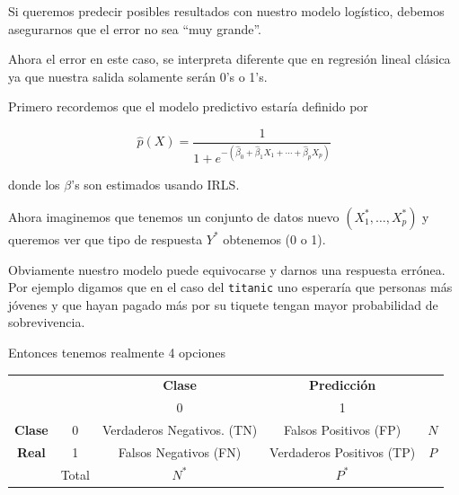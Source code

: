 \documentclass[
  12pt,
]{book}
\newenvironment{Shaded}{\begin{snugshade}}{\end{snugshade}}
\newcommand{\DataTypeTok}[1]{\textcolor[rgb]{0.13,0.29,0.53}{#1}}
\newcommand{\DecValTok}[1]{\textcolor[rgb]{0.00,0.00,0.81}{#1}}
\newcommand{\FloatTok}[1]{\textcolor[rgb]{0.00,0.00,0.81}{#1}}
\newcommand{\KeywordTok}[1]{\textcolor[rgb]{0.13,0.29,0.53}{\textbf{#1}}}
\newcommand{\NormalTok}[1]{#1}
\newcommand{\OperatorTok}[1]{\textcolor[rgb]{0.81,0.36,0.00}{\textbf{#1}}}
\newcommand{\StringTok}[1]{\textcolor[rgb]{0.31,0.60,0.02}{#1}}
\theoremstyle{definition}
\theoremstyle{definition}
\theoremstyle{definition}
\theoremstyle{remark}
\begin{document}
Si queremos predecir posibles resultados con nuestro modelo logístico, debemos asegurarnos que el error no sea \enquote{muy grande}.

Ahora el error en este caso, se interpreta diferente que en regresión lineal clásica ya que nuestra salida solamente serán 0's o 1's.

Primero recordemos que el modelo predictivo estaría definido por

\begin{equation*}
\hat{p}(X)=\frac{1}{1+e^{-(\hat{\beta}_{0}+\hat{\beta}_{1} X_{1}+\cdots+\hat{\beta}_{p} X_{p})}}
\end{equation*}

donde los \(\beta\)'s son estimados usando IRLS.

Ahora imaginemos que tenemos un conjunto de datos nuevo \((X^{*}_{1},\ldots,X^{*}_{p})\) y queremos ver que tipo de respuesta \(Y^{*}\) obtenemos (0 o 1).

Obviamente nuestro modelo puede equivocarse y darnos una respuesta errónea. Por ejemplo digamos que en el caso del \texttt{titanic} uno esperaría que personas más jóvenes y que hayan pagado más por su tiquete tengan mayor probabilidad de sobrevivencia.

Entonces tenemos realmente 4 opciones

\begin{longtable}[]{@{}ccccc@{}}
\toprule
\endhead
& & \textbf{Clase} & \textbf{Predicción} &\tabularnewline
& & 0 & 1 &\tabularnewline
\textbf{Clase} & 0 & Verdaderos Negativos. (TN) & Falsos Positivos (FP) & \(N\)\tabularnewline
\textbf{Real} & 1 & Falsos Negativos (FN) & Verdaderos Positivos (TP) & \(P\)\tabularnewline
& Total & \(N^{*}\) & \(P^{*}\) &\tabularnewline
\bottomrule
\end{longtable}

\begin{Shaded}
\end{Shaded}
\end{document}
